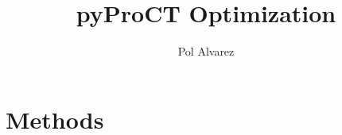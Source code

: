 \documentclass[a4paper,12pt,twoside,hidelinks]{report}
\begin{document}
\title{\LARGE { \vspace*{25mm} \bf pyProCT Optimization}\\
 \vspace*{6mm}
}

\author{Pol Alvarez}

\normallinespacing
\maketitle
\thispagestyle{empty}

\body


\chapter{Methods}














\end{document}
